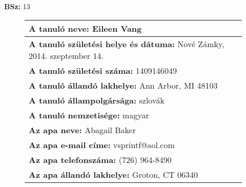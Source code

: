 \documentclass[10pt,a4paper]{article}
\begin{document}
    \vfill
    \textbf{BSz: }13
\newpage
    \begin{figure}[!ht]
    \begin{tabular}{|m{\textwidth}|}
    \hline \vspace{3pt}
    \textbf{A tanuló neve:} \hspace{0.5cm} Eileen Vang \vspace{3pt} \\
\hline\vspace{3pt}
\textbf{A tanuló születési helye és dátuma:} \hspace{0.5cm} Nové Zámky, 2014. szeptember 14. \vspace{3pt} \\
\hline\vspace{3pt}
\textbf{A tanuló születési száma:} \hspace{0.5cm} 1409146049 \vspace{3pt} \\
\hline\vspace{3pt}
\textbf{A tanuló állandó lakhelye:} \hspace{0.5cm} Ann Arbor, MI 48103 \vspace{3pt} \\
\hline\vspace{3pt}
\textbf{A tanuló állampolgársága:} \hspace{0.5cm} szlovák \vspace{3pt} \\
\hline\vspace{3pt}
\textbf{A tanuló nemzetisége:} \hspace{0.5cm} magyar \vspace{3pt} \\
\hline\vspace{3pt}
\textbf{Az apa neve:} \hspace{0.5cm} Abagail Baker \vspace{3pt} \\
\hline\vspace{3pt}
\textbf{Az apa e-mail címe:} \hspace{0.5cm} vsprintf@aol.com \vspace{3pt} \\
\hline\vspace{3pt}
\textbf{Az apa telefonszáma:} \hspace{0.5cm} (726) 964-8490 \vspace{3pt} \\
\hline\vspace{3pt}
\textbf{Az apa állandó lakhelye:} \hspace{0.5cm} Groton, CT 06340 \vspace{3pt} \\

\end{tabular}
\end{figure}
\end{document}

